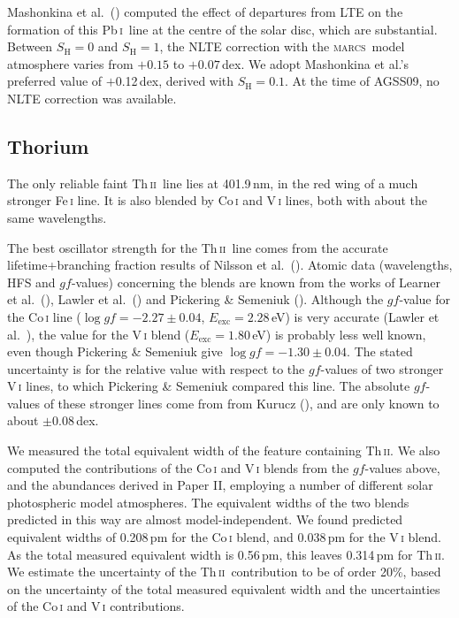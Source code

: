 \documentclass[traditabstract]{aa}
\newcommand{\marcs}{\textsc{marcs}}
\newcommand{\altpbi}{Pb\,\textsc{i}}
\newcommand{\altthii}{Th\,\textsc{ii}}
\newcommand{\pbi}{\altpbi\ }
\newcommand{\thii}{\altthii\ }
\begin{document}
Mashonkina et al.\ (\cite{mash12}) computed the effect of departures from LTE on the formation of this \pbi line at the centre of the solar disc, which are substantial. Between $S_\mathrm{H}=0$ and $S_\mathrm{H}=1$, the NLTE correction with the \marcs\ model atmosphere varies from $+0.15$ to $+0.07$\,dex.  We adopt Mashonkina et al.'s preferred value of $+$0.12\,dex, derived with $S_\mathrm{H}=0.1$.  At the time of AGSS09, no NLTE correction was available.

\subsection{Thorium}
The only reliable faint \thii line lies at 401.9\,nm, in the red wing of a much stronger Fe\,\textsc{i} line. It is also blended by Co\,\textsc{i} and V\,\textsc{i} lines, both with about the same wavelengths.

The best oscillator strength for the \thii line comes from the accurate lifetime+branching fraction results of Nilsson et al.\ (\cite{nils3}).  Atomic data (wavelengths, HFS and $gf$-values) concerning the blends are known from the works of Learner et al.\ (\cite{learn}), Lawler et al.\ (\cite{law9}) and Pickering \& Semeniuk (\cite{pick}).  Although the $gf$-value for the Co\,\textsc{i} line ($\log gf=-2.27\pm0.04$, $E_\mathrm{exc}=2.28$\,eV) is very accurate (Lawler et al.\ \cite{law9}), the value for the V\,\textsc{i} blend ($E_\mathrm{exc}=1.80$\,eV) is probably less well known, even though Pickering \& Semeniuk give $\log gf= -1.30\pm0.04$.  The stated uncertainty is for the relative value with respect to the $gf$-values of two stronger V\,\textsc{i} lines, to which Pickering \& Semeniuk compared this line. The absolute $gf$-values of these stronger lines come from from Kurucz (\cite{kur}), and are only known to about $\pm$0.08\,dex.

We measured the total equivalent width of the feature containing \altthii.  We also computed the contributions of the Co\,\textsc{i} and V\,\textsc{i} blends from the $gf$-values above, and the abundances derived in Paper II, employing a number of different solar photospheric model atmospheres.  The equivalent widths of the two blends predicted in this way are almost model-independent. We found predicted equivalent widths of 0.208\,pm for the Co\,\textsc{i} blend, and 0.038\,pm for the V\,\textsc{i} blend. As the total measured equivalent width is 0.56\,pm, this leaves 0.314\,pm for \altthii. We estimate the uncertainty of the \thii contribution to be of order 20\%, based on the uncertainty of the total measured equivalent width and the uncertainties of the Co\,\textsc{i} and V\,\textsc{i} contributions.
\end{document}
